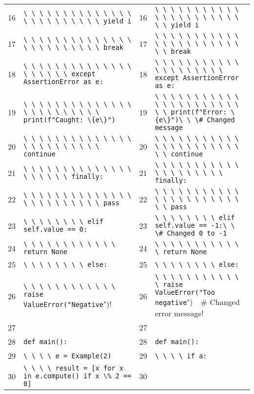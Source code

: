 \documentclass{article}
\newcommand{\code}[1]{\lstinline[style=diffcode]!#1!}
\begin{document}
\begin{tabularx}{\linewidth}{r X r X}
16 & \code{\ \ \ \ \ \ \ \ \ \ \ \ \ \ \ \ \ \ \ \ \ \ \ \ yield i} & 16 & \code{\ \ \ \ \ \ \ \ \ \ \ \ \ \ \ \ \ \ \ \ \ \ \ \ yield i} \\
17 & \code{\ \ \ \ \ \ \ \ \ \ \ \ \ \ \ \ \ \ \ \ \ \ \ \ break} & 17 & \code{\ \ \ \ \ \ \ \ \ \ \ \ \ \ \ \ \ \ \ \ \ \ \ \ break} \\
18 & \code{\ \ \ \ \ \ \ \ \ \ \ \ \ \ \ \ \ \ \ \ except AssertionError as e:} & 18 & \code{\ \ \ \ \ \ \ \ \ \ \ \ \ \ \ \ \ \ \ \ except AssertionError as e:} \\
\cellcolor{remred}19 & \cellcolor{remred}\code{\ \ \ \ \ \ \ \ \ \ \ \ \ \ \ \ \ \ \ \ \ \ \ \ print(f"Caught: \{e\}")} & \cellcolor{addgreen}19 & \cellcolor{addgreen}\code{\ \ \ \ \ \ \ \ \ \ \ \ \ \ \ \ \ \ \ \ \ \ \ \ print(f"Error: \{e\}")\ \ \# Changed message} \\
20 & \code{\ \ \ \ \ \ \ \ \ \ \ \ \ \ \ \ \ \ \ \ \ \ \ \ continue} & 20 & \code{\ \ \ \ \ \ \ \ \ \ \ \ \ \ \ \ \ \ \ \ \ \ \ \ continue} \\
21 & \code{\ \ \ \ \ \ \ \ \ \ \ \ \ \ \ \ \ \ \ \ finally:} & 21 & \code{\ \ \ \ \ \ \ \ \ \ \ \ \ \ \ \ \ \ \ \ finally:} \\
22 & \code{\ \ \ \ \ \ \ \ \ \ \ \ \ \ \ \ \ \ \ \ \ \ \ \ pass} & 22 & \code{\ \ \ \ \ \ \ \ \ \ \ \ \ \ \ \ \ \ \ \ \ \ \ \ pass} \\
\cellcolor{remred}23 & \cellcolor{remred}\code{\ \ \ \ \ \ \ \ elif self.value == 0:} & \cellcolor{addgreen}23 & \cellcolor{addgreen}\code{\ \ \ \ \ \ \ \ elif self.value == -1:\ \ \# Changed 0 to -1} \\
24 & \code{\ \ \ \ \ \ \ \ \ \ \ \ return None} & 24 & \code{\ \ \ \ \ \ \ \ \ \ \ \ return None} \\
25 & \code{\ \ \ \ \ \ \ \ else:} & 25 & \code{\ \ \ \ \ \ \ \ else:} \\
\cellcolor{remred}26 & \cellcolor{remred}\code{\ \ \ \ \ \ \ \ \ \ \ \ raise ValueError("Negative!")} & \cellcolor{addgreen}26 & \cellcolor{addgreen}\code{\ \ \ \ \ \ \ \ \ \ \ \ raise ValueError("Too negative!")\ \ \# Changed error message} \\
27 & \code{} & 27 & \code{} \\
28 & \code{def main():} & 28 & \code{def main():} \\
\cellcolor{remred}29 & \cellcolor{remred}\code{\ \ \ \ e = Example(2)} & \cellcolor{addgreen}29 & \cellcolor{addgreen}\code{\ \ \ \ if a:} \\
\cellcolor{remred}30 & \cellcolor{remred}\code{\ \ \ \ result = [x for x in e.compute() if x \% 2 == 0]} & \cellcolor{addgreen}30 & \cellcolor{addgreen}\code{} \\

\end{tabularx}
\end{document}
